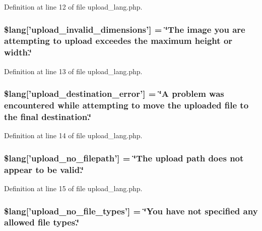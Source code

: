 Definition at line 12 of file upload\-\_\-lang.\-php.

\subsubsection[{\$lang}]{\setlength{\rightskip}{0pt plus 5cm}\$lang['upload\-\_\-invalid\-\_\-dimensions'] = \char`\"{}The image you are attempting {\bf to} upload exceedes the maximum height {\bf or} width.\char`\"{}}\label{upload__lang_8php_a4e796eeccf7df90acffea7884a5bd558}


Definition at line 13 of file upload\-\_\-lang.\-php.

\subsubsection[{\$lang}]{\setlength{\rightskip}{0pt plus 5cm}\$lang['upload\-\_\-destination\-\_\-error'] = \char`\"{}A problem was encountered while attempting {\bf to} move the uploaded file {\bf to} the final destination.\char`\"{}}\label{upload__lang_8php_a31be70c748b9bfc43dd7468e1fa64c42}


Definition at line 14 of file upload\-\_\-lang.\-php.

\subsubsection[{\$lang}]{\setlength{\rightskip}{0pt plus 5cm}\$lang['upload\-\_\-no\-\_\-filepath'] = \char`\"{}The upload path does {\bf not} appear {\bf to} be valid.\char`\"{}}\label{upload__lang_8php_a3c17908c53072c6a5ef593760aaaa704}


Definition at line 15 of file upload\-\_\-lang.\-php.

\subsubsection[{\$lang}]{\setlength{\rightskip}{0pt plus 5cm}\$lang['upload\-\_\-no\-\_\-file\-\_\-types'] = \char`\"{}You have {\bf not} specified any allowed file types.\char`\"{}}\label{upload__lang_8php_ab188c98e583c81905dedaad54ad452bb}


